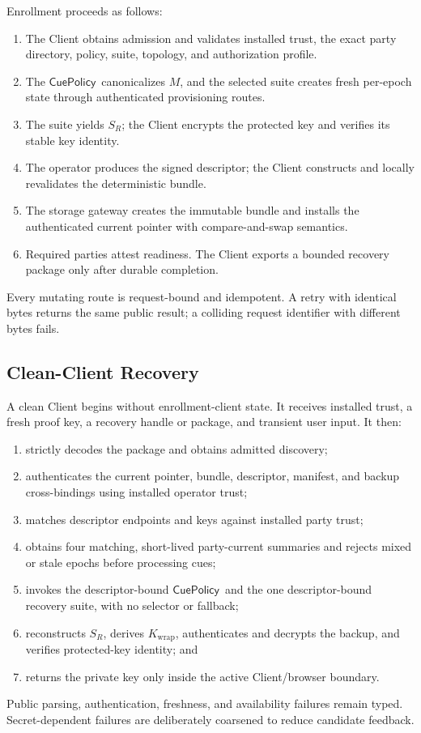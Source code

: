 \documentclass[sigconf,anonymous]{acmart}
\newcommand{\CuePolicy}{\ensuremath{\mathsf{CuePolicy}}}
\begin{document}
Enrollment proceeds as follows:
\begin{enumerate}
  \item The Client obtains admission and validates installed trust, the exact
  party directory, policy, suite, topology, and authorization profile.
  \item The \CuePolicy\ canonicalizes \(M\), and the selected suite creates
  fresh per-epoch state through authenticated provisioning routes.
  \item The suite yields \(S_R\); the Client encrypts the protected key and
  verifies its stable key identity.
  \item The operator produces the signed descriptor; the Client constructs
  and locally revalidates the deterministic bundle.
  \item The storage gateway creates the immutable bundle and installs the
  authenticated current pointer with compare-and-swap semantics.
  \item Required parties attest readiness. The Client exports a bounded
  recovery package only after durable completion.
\end{enumerate}
Every mutating route is request-bound and idempotent. A retry with identical
bytes returns the same public result; a colliding request identifier with
different bytes fails.

\subsection{Clean-Client Recovery}
\label{sec:recovery}

A clean Client begins without enrollment-client state. It receives installed
trust, a fresh proof key, a recovery handle or package, and transient user
input. It then:
\begin{enumerate}
  \item strictly decodes the package and obtains admitted discovery;
  \item authenticates the current pointer, bundle, descriptor, manifest, and
  backup cross-bindings using installed operator trust;
  \item matches descriptor endpoints and keys against installed party trust;
  \item obtains four matching, short-lived party-current summaries and rejects
  mixed or stale epochs before processing cues;
  \item invokes the descriptor-bound \CuePolicy\ and the one descriptor-bound
  recovery suite, with no selector or fallback;
  \item reconstructs \(S_R\), derives \(K_{\mathrm{wrap}}\), authenticates and
  decrypts the backup, and verifies protected-key identity; and
  \item returns the private key only inside the active Client/browser boundary.
\end{enumerate}
Public parsing, authentication, freshness, and availability failures remain
typed. Secret-dependent failures are deliberately coarsened to reduce
candidate feedback.
\end{document}
